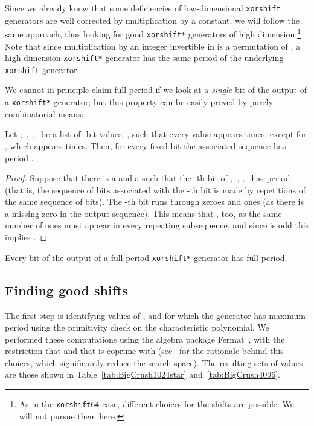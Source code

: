 \documentclass{acmsmalltr}
\newcommand{\lstt}[2]{,~, ,~}
\newcommand{\xorshift}[1][]{\texttt{xorshift#1}\xspace}
\newcommand{\xorshifts}[1][]{\texttt{xorshift#1*}\xspace}
\begin{document}
Since we already know that
some deficiencies of low-dimensional \xorshift generators are well corrected by
multiplication by a constant, we will follow the same approach, thus looking for
good \xorshifts generators of high dimension.\footnote{As in the \xorshift[64] case, different choices for the shifts
are possible. We will not pursue them here.} Note that since
multiplication by an integer invertible in  is a permutation of
, a high-dimension \xorshifts generator has the same
period of the underlying \xorshift generator.

We cannot in principle claim full period if we look at a \emph{single}
bit of the output of a \xorshifts generator; but this property can be easily
proved by purely combinatorial means:

\begin{proposition}
\label{prop:bit}
Let \lstt{\bm x}{2^n} be a list of -bit values, , such that every
value appears  times, except for , which appears  times.
Then, for every fixed bit  the associated sequence has
period .
\end{proposition}
\begin{proof}
Suppose that there is a  and a  such that the -th
bit of \lstt{\bm x}{2^n} has period  (that is, the sequence of bits
associated with the -th bit is made by  repetitions of
the same sequence of  bits). The -th bit runs through  zeroes
and  ones (as there is a missing zero in the output sequence).
This means that , too, as the same number of ones must appear in every repeating subsequence, and
since  is odd this implies .
\end{proof}

\begin{corollary}
Every bit of the output of a full-period \xorshifts generator
has full period.
\end{corollary}

\subsection{Finding good shifts}

The first step is identifying values of ,  and  for which the
generator has maximum period using the primitivity check on the characteristic polynomial.
We performed these computations using the algebra package Fermat~\cite{LewF},
with the restriction that  and that  is coprime with 
(see~\cite{BreSLPRNGUSX} for the rationale behind this choices, which
significantly reduce the search space). The resulting sets of values are those
shown in Table~\ref{tab:BigCrush1024star} and~\ref{tab:BigCrush4096}.
\end{document}
